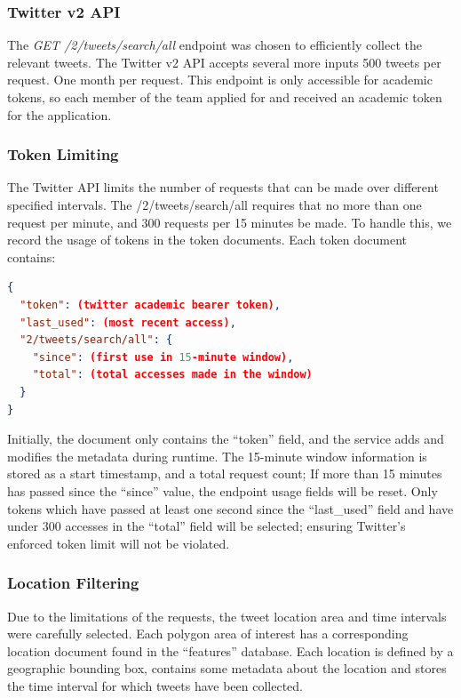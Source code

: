 \documentclass[parskip=full, 11pt]{article}
\begin{document}
\subsubsection{Twitter v2 API}

The \emph{GET /2/tweets/search/all} endpoint was chosen to efficiently collect the relevant tweets.
The Twitter v2 API accepts several more inputs 
500 tweets per request.
One month per request.
This endpoint is only accessible for academic tokens, so each member of the team applied for and received an academic token for the application.

\subsubsection{Token Limiting}
The Twitter API limits the number of requests that can be made over different specified intervals.
The /2/tweets/search/all requires that no more than one request per minute, and 300 requests per 15 minutes be made.
To handle this, we record the usage of tokens in the token documents. Each token document contains:

\begin{lstlisting}[language=Json]
{
  "token": (twitter academic bearer token),
  "last_used": (most recent access),
  "2/tweets/search/all": {
    "since": (first use in 15-minute window),
    "total": (total accesses made in the window)
  }
}
\end{lstlisting}

Initially, the document only contains the “token” field, and the service adds and modifies the metadata during runtime.
The 15-minute window information is stored as a start timestamp, and a total request count; If more than 15 minutes has passed since the “since” value, the endpoint usage fields will be reset.
Only tokens which have passed at least one second since the “last\_used” field and have under 300 accesses in the “total” field will be selected; ensuring Twitter’s enforced token limit will not be violated.

\subsubsection{Location Filtering}
Due to the limitations of the requests, the tweet location area and time intervals were carefully selected.
Each polygon area of interest has a corresponding location document found in the “features” database. Each location is defined by a geographic bounding box, contains some metadata about the location and stores the time interval for which tweets have been collected.
\end{document}
